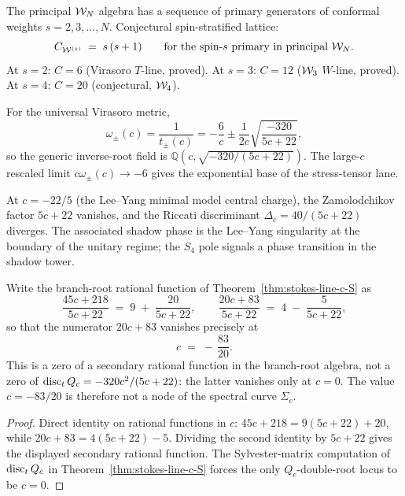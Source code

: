 \begin{remark}
\label{rem:spin-stratified-cwsl}
The principal $\mathcal{W}_N$ algebra has a sequence of primary
generators of conformal weights $s = 2, 3, \dots, N$. Conjectural
spin-stratified lattice:
\[
C_{\mathcal{W}^{(s)}} \;=\; s\,(s + 1)
\qquad
\text{for the spin-$s$ primary in principal } \mathcal{W}_N.
\]
At $s = 2$: $C = 6$ (Virasoro $T$-line, proved). At $s = 3$:
$C = 12$ ($\mathcal{W}_3$ $W$-line, proved). At $s = 4$:
$C = 20$ (conjectural, $\mathcal{W}_4$).
\end{remark}

\begin{proposition}
\label{prop:virasoro-inverse-root-field}
\ClaimStatusProvedElsewhere
For the universal Virasoro metric,
\[
\omega_\pm(c)=\frac{1}{t_\pm(c)}
=-\frac{6}{c}\pm
\frac{1}{2c}\sqrt{\frac{-320}{5c+22}},
\]
so the generic inverse-root field is
$\mathbb Q(c,\sqrt{-320/(5c+22)})$. The large-$c$ rescaled limit
$c\omega_\pm(c)\to -6$ gives the exponential base of the
stress-tensor lane.
\end{proposition}

\begin{proposition}[Lee--Yang pole at $c = -22/5$]
\label{prop:lee-yang-phase}
\ClaimStatusProvedElsewhere
At $c = -22/5$ (the Lee--Yang minimal model central charge), the
Zamolodchikov factor $5 c + 22$ vanishes, and the Riccati
discriminant $\Delta_c = 40/(5 c + 22)$ diverges. The associated
shadow phase is the Lee--Yang singularity at the boundary of the
unitary regime; the $S_4$ pole signals a phase transition in the
shadow tower.
\end{proposition}

\begin{proposition}[Secondary rational zero at $c = -83/20$]
\label{prop:double-root-phase}
\ClaimStatusProvedHere
Write the branch-root rational function of
Theorem~\ref{thm:stokes-line-c-S} as
\[
\frac{45 c + 218}{5 c + 22}
\;=\; 9 \;+\; \frac{20}{5 c + 22},
\qquad
\frac{20 c + 83}{5 c + 22}
\;=\; 4 \;-\; \frac{5}{5 c + 22},
\]
so that the numerator $20 c + 83$ vanishes precisely at
\[
c \;=\; -\,\frac{83}{20}.
\]
This is a zero of a secondary rational function in the branch-root
algebra, not a zero of $\operatorname{disc}_t Q_c = -320 c^{2}/(5 c + 22)$: the
latter vanishes only at $c = 0$. The value $c=-83/20$ is therefore
not a node of the spectral curve $\Sigma_c$.
\end{proposition}

\begin{proof}
Direct identity on rational functions in $c$: $45 c + 218 =
9(5 c + 22) + 20$, while
$20 c + 83 = 4(5 c + 22) - 5$. Dividing the second identity by
$5 c + 22$ gives the displayed secondary rational function. The
Sylvester-matrix
computation of $\operatorname{disc}_t Q_c$ in Theorem~\ref{thm:stokes-line-c-S}
forces the only $Q_c$-double-root locus to be $c = 0$.
\end{proof}

